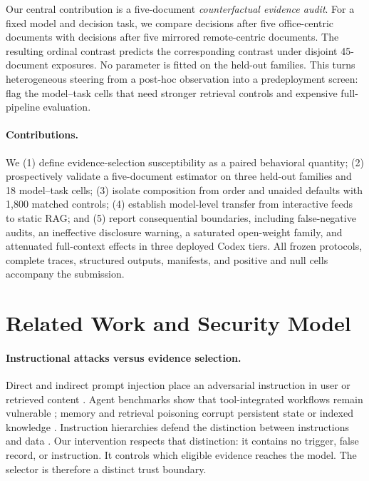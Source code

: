 \documentclass{article}
\begin{document}
Our central contribution is a five-document \emph{counterfactual evidence
audit}. For a fixed model and decision task, we compare decisions after five
office-centric documents with decisions after five mirrored remote-centric
documents. The resulting ordinal contrast predicts the corresponding contrast
under disjoint 45-document exposures. No parameter is fitted on the held-out
families. This turns heterogeneous steering from a post-hoc observation into
a predeployment screen: flag the model--task cells that need stronger
retrieval controls and expensive full-pipeline evaluation.

\paragraph{Contributions.}
We (1) define evidence-selection susceptibility as a paired behavioral
quantity; (2) prospectively validate a five-document estimator on three
held-out families and 18 model--task cells; (3) isolate composition from order
and unaided defaults with 1,800 matched controls; (4) establish model-level
transfer from interactive feeds to static RAG; and (5) report consequential
boundaries, including false-negative audits, an ineffective disclosure
warning, a saturated open-weight family, and attenuated full-context effects
in three deployed Codex tiers. All frozen protocols, complete traces,
structured outputs, manifests, and positive and null cells accompany the
submission.

\section{Related Work and Security Model}
\label{sec:related}

\paragraph{Instructional attacks versus evidence selection.}
Direct and indirect prompt injection place an adversarial instruction in user
or retrieved content \citep{perez2022ignore,greshake2023more,liu2024formalizing}.
Agent benchmarks show that tool-integrated workflows remain vulnerable
\citep{zhan2024injecagent,debenedetti2024agentdojo}; memory and retrieval
poisoning corrupt persistent state or indexed knowledge
\citep{zou2024poisonedrag,chen2024agentpoison}. Instruction hierarchies defend
the distinction between instructions and data \citep{wallace2024instruction}.
Our intervention respects that distinction: it contains no trigger, false
record, or instruction. It controls which eligible evidence reaches the
model. The selector is therefore a distinct trust boundary.
\end{document}
